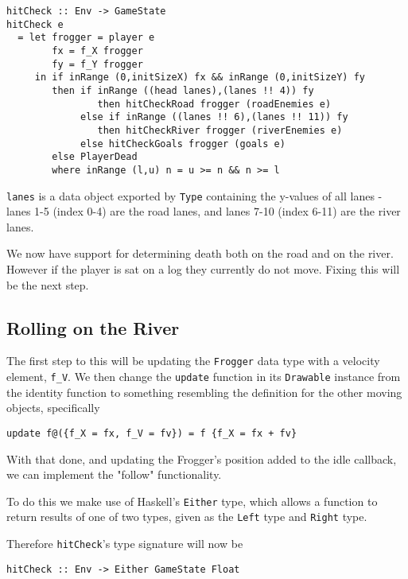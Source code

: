 \documentclass[12pt, a4paper]{report}
\begin{document}
\begin{lstlisting}
hitCheck :: Env -> GameState
hitCheck e
  = let frogger = player e
        fx = f_X frogger
        fy = f_Y frogger
     in if inRange (0,initSizeX) fx && inRange (0,initSizeY) fy
        then if inRange ((head lanes),(lanes !! 4)) fy
                then hitCheckRoad frogger (roadEnemies e)
             else if inRange ((lanes !! 6),(lanes !! 11)) fy
                then hitCheckRiver frogger (riverEnemies e)
             else hitCheckGoals frogger (goals e)
        else PlayerDead
        where inRange (l,u) n = u >= n && n >= l
\end{lstlisting}

\verb|lanes| is a data object exported by \verb|Type| containing the y-values of all lanes - lanes 1-5 (index 0-4) are the road lanes, and lanes 7-10 (index 6-11) are the river lanes.

We now have support for determining death both on the road and on the river.
However if the player is sat on a log they currently do not move.
Fixing this will be the next step.

\subsection{Rolling on the River}

The first step to this will be updating the \verb|Frogger| data type with a velocity element, \verb|f_V|.
We then change the \verb|update| function in its \verb|Drawable| instance from the identity function to something resembling the definition for the other moving objects, specifically

\begin{lstlisting}
update f@({f_X = fx, f_V = fv}) = f {f_X = fx + fv}
\end{lstlisting}

With that done, and updating the Frogger's position added to the idle callback, we can implement the "follow" functionality.

\par

To do this we make use of Haskell's \verb|Either| type, which allows a function to return results of one of two types, given as the \verb|Left| type and \verb|Right| type.

Therefore \verb|hitCheck|'s type signature will now be

\begin{lstlisting}
hitCheck :: Env -> Either GameState Float
\end{lstlisting}
\end{document}
